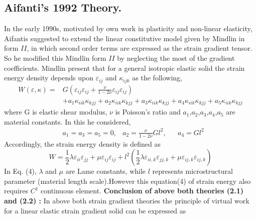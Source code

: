 \documentclass[12pt]{article}
\begin{document}
\subsection{Aifanti's 1992 Theory.} 
In the early 1990s, motivated by own work in plasticity and non-linear elasticity, Aifantis suggested to extend the linear constitutive model given by Mindlin in form $II$, in which second order terms are expressed as the strain gradient tensor. So he modified this Mindlin form $II$ by neglecting the most of the gradient coefficients. Mindlin present that for a general isotropic elastic solid the strain energy density depends upon
$\varepsilon_{ij}$ and $\kappa_{ijk}$ as the following,
\begin{equation}
\begin{aligned}
W(\varepsilon,\kappa) = 
& G(\varepsilon_{ij}\varepsilon_{ij}+\frac{\nu}{1-2\nu}\varepsilon_{ij}\varepsilon_{ij}) \\
&    +a_1\kappa_{iik}\kappa_{kjj}+a_2\kappa_{iik}\kappa_{kjj}+a_3\kappa_{iik}\kappa_{kjj}+a_4\kappa_{iik}\kappa_{kjj}+a_5\kappa_{iik}\kappa_{kjj}
\end{aligned}
\end{equation}
where G is elastic shear modulus, $\nu$ is Poisson's ratio and $a_1$,$a_2$,$a_3$,$a_4$,$a_5$ are material constants.   
\newline
In this he considered,
\newline
\begin{equation}
\begin{aligned}
& a_1 = a_3 = a_5 = 0,   &   a_2 = \frac{\nu}{1-2\nu}Gl^2, &&  a_4 = Gl^2
\end{aligned}
\end{equation} 
Accordingly, the strain energy density is defined as
\begin{equation}
W = \frac{1}{2}\lambda\varepsilon_{ii}\varepsilon_{jj}+\mu\varepsilon_{ij}\varepsilon_{ij}+l^2(\frac{1}{2}\lambda\varepsilon_{ii,k}\varepsilon_{jj,k}+\mu\varepsilon_{ij,k}\varepsilon_{ij,k})
\end{equation}
In Eq. (4), $\lambda$ and $\mu$ are Lame constants, while $l$ represents microstructural parameter (material length scale).However this equation(4) of strain energy also requires 
$C^{1}$ continuous element.
\newline
\newline
\textbf{Conclusion of above both theories (2.1) and (2.2) : }
\newline
\newline
In above both strain gradient theories the principle of virtual work for a linear elastic strain gradient solid can be expressed as
\end{document}

